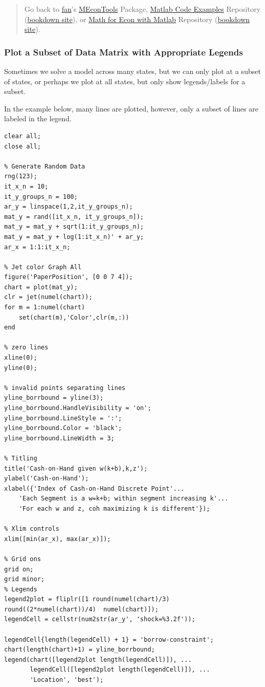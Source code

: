 \documentclass[
]{book}
\begin{document}
\begin{quote}
Go back to \href{http://fanwangecon.github.io/}{fan}'s \href{https://fanwangecon.github.io/MEconTools/}{MEconTools} Package, \href{https://fanwangecon.github.io/M4Econ/}{Matlab Code Examples} Repository (\href{https://fanwangecon.github.io/M4Econ/bookdown}{bookdown site}), or \href{https://fanwangecon.github.io/Math4Econ/}{Math for Econ with Matlab} Repository (\href{https://fanwangecon.github.io/Math4Econ/bookdown}{bookdown site}).
\end{quote}

\hypertarget{plot-a-subset-of-data-matrix-with-appropriate-legends}{%
\subsubsection{Plot a Subset of Data Matrix with Appropriate Legends}\label{plot-a-subset-of-data-matrix-with-appropriate-legends}}

Sometimes we solve a model across many states, but we can only plot at a
subset of states, or perhaps we plot at all states, but only show
legends/labels for a subset.

In the example below, many lines are plotted, however, only a subset of
lines are labeled in the legend.

\begin{verbatim}
clear all;
close all;

% Generate Random Data
rng(123);
it_x_n = 10;
it_y_groups_n = 100;
ar_y = linspace(1,2,it_y_groups_n);
mat_y = rand([it_x_n, it_y_groups_n]);
mat_y = mat_y + sqrt(1:it_y_groups_n);
mat_y = mat_y + log(1:it_x_n)' + ar_y;
ar_x = 1:1:it_x_n;

% Jet color Graph All
figure('PaperPosition', [0 0 7 4]);
chart = plot(mat_y);
clr = jet(numel(chart));
for m = 1:numel(chart)
    set(chart(m),'Color',clr(m,:))
end

% zero lines
xline(0);
yline(0);

% invalid points separating lines
yline_borrbound = yline(3);
yline_borrbound.HandleVisibility = 'on';
yline_borrbound.LineStyle = ':';
yline_borrbound.Color = 'black';
yline_borrbound.LineWidth = 3;

% Titling
title('Cash-on-Hand given w(k+b),k,z');
ylabel('Cash-on-Hand');
xlabel({'Index of Cash-on-Hand Discrete Point'...
    'Each Segment is a w=k+b; within segment increasing k'...
    'For each w and z, coh maximizing k is different'});

% Xlim controls
xlim([min(ar_x), max(ar_x)]);

% Grid ons
grid on;
grid minor;
% Legends
legend2plot = fliplr([1 round(numel(chart)/3) round((2*numel(chart))/4)  numel(chart)]);
legendCell = cellstr(num2str(ar_y', 'shock=%3.2f'));

legendCell{length(legendCell) + 1} = 'borrow-constraint';
chart(length(chart)+1) = yline_borrbound;
legend(chart([legend2plot length(legendCell)]), ...
       legendCell([legend2plot length(legendCell)]), ...
       'Location', 'best');
\end{verbatim}
\end{document}
